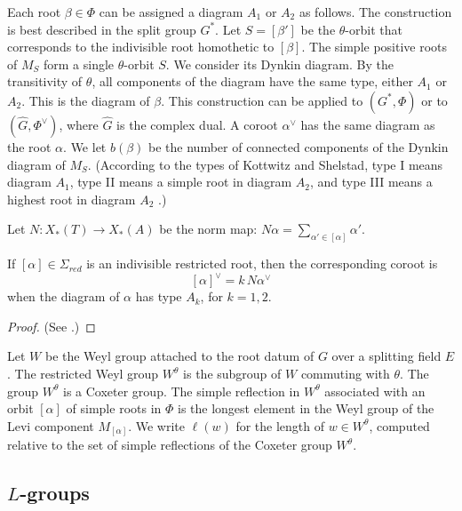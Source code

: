 Each root $\beta\in\Phi$ can be assigned a diagram $A_1$ or $A_2$ as
follows.  The construction is best described in the split group $G^*$.
Let $S=[\beta']$ be the $\theta$-orbit that corresponds to the
indivisible root homothetic to $[\beta]$.  The simple positive roots
of $M_S$ form a single $\theta$-orbit $S$.  We consider its Dynkin
diagram.  By the transitivity of $\theta$, all components of the
diagram have the same type, either $A_1$ or $A_2$.  This is the
diagram of $\beta$.  This construction can be applied to $(G^*,\Phi)$
or to $(\hat G,\Phi^\vee)$, where $\hat G$ is the complex dual.  A
coroot $\alpha^\vee$ has the same diagram as the root $\alpha$.  We let
$b(\beta)$ be the number of connected components of the Dynkin
diagram of $M_S$.  (According to the types of Kottwitz and Shelstad, type I
means diagram $A_1$, type II means a simple root in diagram $A_2$, and
type III means a highest root in diagram $A_2$
\cite{kottwitz1999foundations}.)

Let $N:X_*(T)\to X_*(A)$ be the norm map: 
$N\alpha = \sum_{\alpha'\in  [\alpha]} \alpha'$.

\begin{lemma}\label{lemma:norm}
 If $[\alpha]\in\Sigma_{red}$ is an indivisible restricted root, then
  the corresponding coroot is
\begin{equation}\label{eqn:norm}
[\alpha]^\vee = k\, N\alpha^\vee
\end{equation}
when the diagram of $\alpha$ has type $A_k$, for $k=1,2$.
\end{lemma}

\begin{proof}
(See \cite[1.3.9]{kottwitz1999foundations}.)
\end{proof}

Let $W$ be the Weyl group attached to the root datum of $G$ over a
splitting field $E$.  The restricted Weyl group $W^\theta$ is the
subgroup of $W$ commuting with $\theta$.  The group $W^\theta$ is a
Coxeter group.  The simple reflection in $W^\theta$ associated with an
orbit $[\alpha]$ of simple roots in $\Phi$ is the longest element in
the Weyl group of the Levi component $M_{[\alpha]}$.  We write
$\ell(w)$ for the length of $w\in W^\theta$, computed relative to the
set of simple reflections of the Coxeter group $W^\theta$.

\subsection{$L$-groups}

